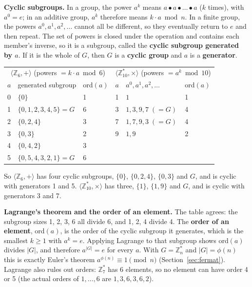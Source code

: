 \textbf{Cyclic subgroups.} In a group, the power $a^k$ means $a \bullet a \bullet \dots \bullet a$ ($k$ times), with $a^0 = e$; in an additive group, $a^k$ therefore means $k \cdot a \bmod n$. In a finite group, the powers $a^0, a^1, a^2, \dots$ cannot all be different, so they eventually return to $e$ and then repeat. The set of powers is closed under the operation and contains each member's inverse, so it is a subgroup, called the \textbf{cyclic subgroup generated by $a$}. If it is the whole of $G$, then $G$ is a \textbf{cyclic group} and $a$ is a \textbf{generator}.
\begin{center}\small
\begin{tabular}{@{}lll|lll@{}}
\toprule
\multicolumn{3}{c|}{$\langle \mathbb{Z}_6, + \rangle$ (powers $= k \cdot a \bmod 6$)} & \multicolumn{3}{c}{$\langle \mathbb{Z}_{10}^*, \times \rangle$ (powers $= a^k \bmod 10$)}\\
$a$ & generated subgroup & ord$(a)$ & $a$ & $a^0, a^1, a^2, \dots$ & ord$(a)$\\
\midrule
0 & $\{0\}$ & 1 & 1 & $1$ & 1\\
1 & $\{0, 1, 2, 3, 4, 5\} = G$ & 6 & 3 & $1, 3, 9, 7 \;(= G)$ & 4\\
2 & $\{0, 2, 4\}$ & 3 & 7 & $1, 7, 9, 3 \;(= G)$ & 4\\
3 & $\{0, 3\}$ & 2 & 9 & $1, 9$ & 2\\
4 & $\{0, 4, 2\}$ & 3 & & & \\
5 & $\{0, 5, 4, 3, 2, 1\} = G$ & 6 & & & \\
\bottomrule
\end{tabular}
\end{center}
So $\langle \mathbb{Z}_6, + \rangle$ has four cyclic subgroups, $\{0\}$, $\{0, 2, 4\}$, $\{0, 3\}$ and $G$, and is cyclic with generators 1 and 5. $\langle \mathbb{Z}_{10}^*, \times \rangle$ has three, $\{1\}$, $\{1, 9\}$ and $G$, and is cyclic with generators 3 and 7.

\textbf{Lagrange's theorem and the order of an element.}  The table agrees: the subgroup sizes 1, 2, 3, 6 all divide 6, and 1, 2, 4 divide 4. The \textbf{order of an element}, ord$(a)$, is the order of the cyclic subgroup it generates, which is the smallest $k \ge 1$ with $a^k = e$. Applying Lagrange to that subgroup shows ord$(a)$ divides $|G|$, and therefore $a^{|G|} = e$ for every $a$. With $G = \mathbb{Z}_n^*$ and $|G| = \phi(n)$ this is exactly Euler's theorem $a^{\phi(n)} \equiv 1 \pmod n$ (Section~\ref{sec:fermat}). Lagrange also rules out orders: $\mathbb{Z}_7^*$ has 6 elements, so no element can have order 4 or 5 (the actual orders of $1, \dots, 6$ are $1, 3, 6, 3, 6, 2$).

